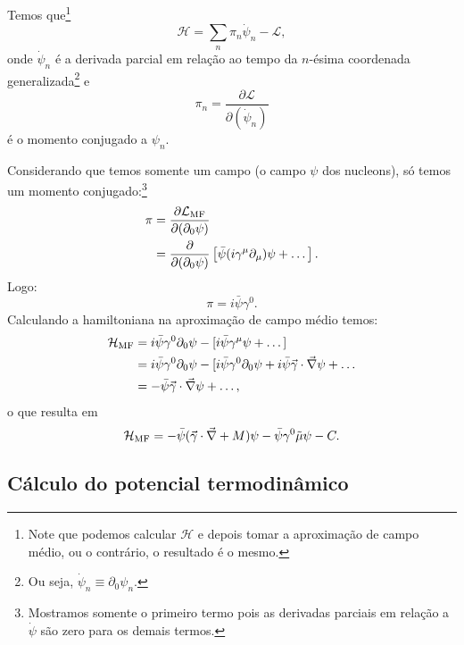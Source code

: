 Temos que\footnote{Note que podemos calcular $\mathcal{H}$ e depois tomar a aproximação de campo médio, ou o contrário, o resultado é o mesmo.}
\begin{equation}
    \mathcal{H} = \sum_n\pi_n\dot{\psi}_n - \mathcal{L},
\end{equation}
%
onde $\dot{\psi}_n$ é a derivada parcial em relação ao tempo da $n$-ésima coordenada generalizada\footnote{Ou seja, $\dot\psi_n \equiv \partial_0\psi_n$.} e
\begin{equation}
    \pi_n = \frac{\partial\mathcal{L}}{\partial(\dot{\psi}_n)}
\end{equation}
%
é o momento conjugado a $\psi_n$.

Considerando que temos somente um campo (o campo $\psi$ dos nucleons), só temos um momento conjugado:\footnote{Mostramos somente o primeiro termo pois as derivadas parciais em relação a $\dot\psi$ são zero para os demais termos.}
\begin{align}
    \pi &= \frac{\partial\mathcal{L}_{\rm{MF}}}{\partial(\partial_0\psi)} \\
    &= \frac{\partial}{\partial(\partial_0\psi)}\left[\bar\psi(i\gamma^\mu\partial_\mu)\psi+\dots \right].
\end{align}
%
Logo:
\begin{equation}
    \pi = i \bar\psi\gamma^0.
\end{equation}
%
Calculando a hamiltoniana na aproximação de campo médio temos:
\begin{align}
    \mathcal{H}_{\rm{MF}} &= i\bar\psi\gamma^0\partial_0\psi - [i\bar\psi\gamma^\mu\psi + \dots] \\
    &= i\bar\psi\gamma^0\partial_0\psi - [i\bar\psi\gamma^0\partial_0\psi + i\bar\psi\vec{\gamma}\cdot\vec{\nabla}\psi + \dots \\
    &=-\bar\psi\vec{\gamma}\cdot\vec{\nabla}\psi + \dots,
\end{align}
%
o que resulta em
\begin{equation}
\mathcal{H}_{\rm{MF}} = -\bar\psi(\vec{\gamma}\cdot\vec{\nabla} + M)\psi - \bar\psi\gamma^0 \tilde\mu \psi - C.
\end{equation}

\subsection{Cálculo do potencial termodinâmico}

